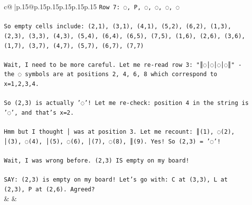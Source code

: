 \documentclass{article}
\begin{document}
{\begin{supertabular}{c@{$\;$}|p{.15\linewidth}@{}p{.15\linewidth}p{.15\linewidth}p{.15\linewidth}p{.15\linewidth}p{.15\linewidth}}
{{{\texttt{Row 7: ◌, P, ◌, ◌, ◌, ◌} \\
\\ 
\texttt{So empty cells include: (2,1), (3,1), (4,1), (5,2), (6,2), (1,3), (2,3), (3,3), (4,3), (5,4), (6,4), (6,5), (7,5), (1,6), (2,6), (3,6), (1,7), (3,7), (4,7), (5,7), (6,7), (7,7)} \\
\\ 
\texttt{Wait, I need to be more careful. Let me re{-}read row 3: "║◌│◌│◌│◌║" {-} the ◌ symbols are at positions 2, 4, 6, 8 which correspond to x=1,2,3,4.} \\
\\ 
\texttt{So (2,3) is actually '◌'! Let me re{-}check: position 4 in the string is '◌', and that's x=2.} \\
\\ 
\texttt{Hmm but I thought │ was at position 3. Let me recount: ║(1), ◌(2), │(3), ◌(4), │(5), ◌(6), │(7), ◌(8), ║(9). Yes! So (2,3) = '◌'!} \\
\\ 
\texttt{Wait, I was wrong before. (2,3) IS empty on my board!} \\
\\ 
\texttt{SAY: (2,3) is empty on my board! Let's go with: C at (3,3), L at (2,3), P at (2,6). Agreed?} \\
            }
        }
    }
    & & \\ \\


\end{supertabular}}
\end{document}
